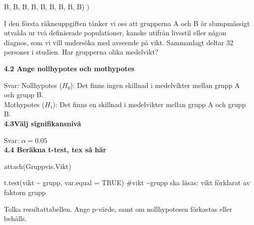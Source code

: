 \documentclass[
  letterpaper,
  DIV=11,
  numbers=noendperiod]{scrartcl}
\newenvironment{Shaded}{\begin{snugshade}}{\end{snugshade}}
\newcommand{\NormalTok}[1]{\textcolor[rgb]{0.00,0.23,0.31}{#1}}
\newcommand{\StringTok}[1]{\textcolor[rgb]{0.13,0.47,0.30}{#1}}
\begin{document}
\begin{Shaded}
\begin{Highlighting}[]
            \StringTok{\textquotesingle{}B\textquotesingle{}}\NormalTok{, }\StringTok{\textquotesingle{}B\textquotesingle{}}\NormalTok{, }\StringTok{\textquotesingle{}B\textquotesingle{}}\NormalTok{, }\StringTok{\textquotesingle{}B\textquotesingle{}}\NormalTok{, }\StringTok{\textquotesingle{}B\textquotesingle{}}\NormalTok{, }\StringTok{\textquotesingle{}B\textquotesingle{}}\NormalTok{, }\StringTok{\textquotesingle{}B\textquotesingle{}}\NormalTok{, }\StringTok{\textquotesingle{}B\textquotesingle{}}\NormalTok{, }\StringTok{\textquotesingle{}B\textquotesingle{}}\NormalTok{)}
\NormalTok{)}
\end{Highlighting}
\end{Shaded}

I den första räkneuppgiften tänker vi oss att grupperna A och B är
slumpmässigt utvalda ur två definierade populationer, kanske utifrån
livsstil eller någon diagnos, som vi vill undersöka med avseende på
vikt. Sammanlagt deltar 32 personer i studien. Har grupperna olika
medelvikt?

\textbf{4.2 Ange nollhypotes och mothypotes}

\hfill\break
Svar: Nollhypotes (\(H₀\)): Det finns ingen skillnad i medelvikter
mellan grupp A och grupp B.\\
Mothypotes (\(H₁\)): Det finns en skillnad i medelvikter mellan grupp A
och grupp B.\\

\textbf{4.3Välj signifikansnivå}

\hfill\break
Svar: \(\alpha = 0.05\)\\

\textbf{4.4 Beräkna t-test, tex så här}

attach(Gruppvis.Vikt)

t.test(vikt \textasciitilde{} grupp, var.equal = TRUE) \#vikt
\textasciitilde grupp ska läsas: vikt förklarat av faktorn grupp

Tolka resultattabellen. Ange p-värde, samt om nollhypotesen förkastas
eller behålls.
\end{document}
